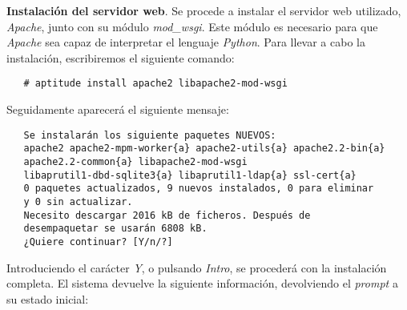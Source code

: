 \item \textbf{Instalación del servidor web}.
   Se procede a instalar el servidor web utilizado, \textit{Apache}, junto
   con su módulo \textit{mod\_wsgi}. Este módulo es necesario para que
   \textit{Apache} sea capaz de interpretar el lenguaje \textit{Python}. Para
   llevar a cabo la instalación, escribiremos el siguiente comando:

   \begin{verbatim}
   # aptitude install apache2 libapache2-mod-wsgi
   \end{verbatim}

   Seguidamente aparecerá el siguiente mensaje:

   \begin{verbatim}
   Se instalarán los siguiente paquetes NUEVOS:
   apache2 apache2-mpm-worker{a} apache2-utils{a} apache2.2-bin{a}
   apache2.2-common{a} libapache2-mod-wsgi
   libaprutil1-dbd-sqlite3{a} libaprutil1-ldap{a} ssl-cert{a}
   0 paquetes actualizados, 9 nuevos instalados, 0 para eliminar
   y 0 sin actualizar.
   Necesito descargar 2016 kB de ficheros. Después de
   desempaquetar se usarán 6808 kB.
   ¿Quiere continuar? [Y/n/?]
   \end{verbatim}

   Introduciendo el carácter \textit{Y}, o pulsando \textit{Intro}, se procederá
   con la instalación completa. El sistema devuelve la siguiente información,
   devolviendo el \textit{prompt} a su estado inicial:

